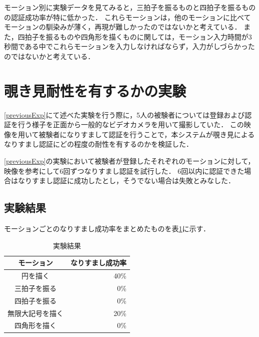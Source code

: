 \documentclass[11pt]{jreport}
\begin{document}
    モーション別に実験データを見てみると，三拍子を振るものと四拍子を振るものの認証成功率が特に低かった．
    これらモーションは，他のモーションに比べてモーションの馴染みが薄く，再現が難しかったのではないかと考えている．
    また，四拍子を振るものや四角形を描くものに関しては，モーション入力時間が3秒間である中でこれらモーションを入力しなければならず，入力がしづらかったのではないかと考えている．

    \section{覗き見耐性を有するかの実験}
    \ref{previousExp}にて述べた実験を行う際に，5人の被験者については登録および認証を行う様子を正面から一般的なビデオカメラを用いて撮影していた．
    この映像を用いて被験者になりすまして認証を行うことで，本システムが覗き見によるなりすまし認証にどの程度の耐性を有するのかを検証した．

    \ref{previousExp}の実験において被験者が登録したそれぞれのモーションに対して，映像を参考にして6回ずつなりすまし認証を試行した．
    6回以内に認証できた場合はなりすまし認証に成功したとし，そうでない場合は失敗とみなした．

    \subsection{実験結果}
    モーションごとのなりすまし成功率をまとめたものを表\ref{spoofing}に示す．

    \begin{table}[htb]
        \begin{center}
            \caption{実験結果}
            \label{spoofing}
            \begin{tabular}{|c|r|} \hline
                モーション & なりすまし成功率 \\ \hline \hline
                円を描く & 40\% \\ \hline
                三拍子を振る & 0\% \\ \hline
                四拍子を振る & 0\% \\ \hline
                無限大記号を描く & 20\% \\ \hline
                四角形を描く & 0\% \\ \hline
            \end{tabular}
        \end{center}
    \end{table}
\end{document}

